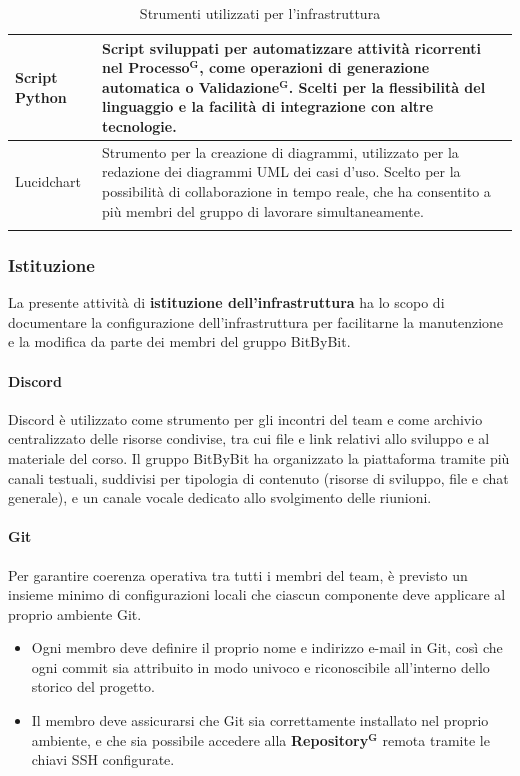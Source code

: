 \documentclass[a4paper,12pt]{article}
\newcommand{\term}[1]{\textbf{#1}$^\mathbf{G}$}
\begin{document}
\begin{center}
\begin{longtable}{| m{3cm} | m{} |}
\centering Script Python & Script sviluppati per automatizzare attività ricorrenti nel \term{Processo}, come operazioni di generazione automatica o \term{Validazione}. Scelti per la flessibilità del linguaggio e la facilità di integrazione con altre tecnologie.\\
\hline
\rowcolor{white}
\centering Lucidchart & Strumento per la creazione di diagrammi, utilizzato per la redazione dei diagrammi UML dei casi d’uso. Scelto per la possibilità di collaborazione in tempo reale, che ha consentito a più membri del gruppo di lavorare simultaneamente.\\
\hline
\caption{Strumenti utilizzati per l'infrastruttura} \\
\end{longtable}
\end{center}

\subsubsection{Istituzione} \label{par:p-infrastruttura-istituzione}
La presente attività di \textbf{istituzione dell'infrastruttura} ha lo scopo di documentare la configurazione dell'infrastruttura per facilitarne la manutenzione e la modifica da parte dei membri del gruppo BitByBit.

\paragraph{Discord}
Discord è utilizzato come strumento per gli incontri del team e come archivio centralizzato delle risorse condivise, tra cui file e link relativi allo sviluppo e al materiale del corso.  
Il gruppo BitByBit ha organizzato la piattaforma tramite più canali testuali, suddivisi per tipologia di contenuto (risorse di sviluppo, file e chat generale), e un canale vocale dedicato allo svolgimento delle riunioni.

\paragraph{Git}
Per garantire coerenza operativa tra tutti i membri del team, è previsto un insieme minimo di configurazioni locali che ciascun componente deve applicare al proprio ambiente Git.
\begin{itemize}
    \item Ogni membro deve definire il proprio nome e indirizzo e-mail in Git, così che ogni commit sia attribuito in modo univoco e riconoscibile all’interno dello storico del progetto.
    \item Il membro deve assicurarsi che Git sia correttamente installato nel proprio ambiente, e che sia possibile accedere alla \term{Repository} remota tramite le chiavi SSH configurate.
\end{itemize}
\end{document}

